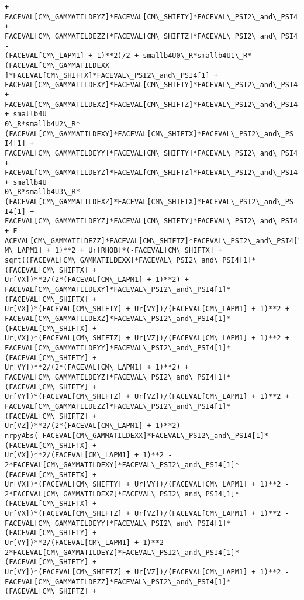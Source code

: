 \documentclass[landscape,letterpaper,10pt,english]{article}
\begin{document}
\begin{Verbatim}[commandchars=\\\{\}]
+ FACEVAL[CM\_GAMMATILDEYZ]*FACEVAL[CM\_SHIFTY]*FACEVAL\_PSI2\_and\_PSI4[1] +
FACEVAL[CM\_GAMMATILDEZZ]*FACEVAL[CM\_SHIFTZ]*FACEVAL\_PSI2\_and\_PSI4[1]) -
(FACEVAL[CM\_LAPM1] + 1)**2)/2 + smallb4U0\_R*smallb4U1\_R*(FACEVAL[CM\_GAMMATILDEXX
]*FACEVAL[CM\_SHIFTX]*FACEVAL\_PSI2\_and\_PSI4[1] +
FACEVAL[CM\_GAMMATILDEXY]*FACEVAL[CM\_SHIFTY]*FACEVAL\_PSI2\_and\_PSI4[1] +
FACEVAL[CM\_GAMMATILDEXZ]*FACEVAL[CM\_SHIFTZ]*FACEVAL\_PSI2\_and\_PSI4[1]) + smallb4U
0\_R*smallb4U2\_R*(FACEVAL[CM\_GAMMATILDEXY]*FACEVAL[CM\_SHIFTX]*FACEVAL\_PSI2\_and\_PS
I4[1] + FACEVAL[CM\_GAMMATILDEYY]*FACEVAL[CM\_SHIFTY]*FACEVAL\_PSI2\_and\_PSI4[1] +
FACEVAL[CM\_GAMMATILDEYZ]*FACEVAL[CM\_SHIFTZ]*FACEVAL\_PSI2\_and\_PSI4[1]) + smallb4U
0\_R*smallb4U3\_R*(FACEVAL[CM\_GAMMATILDEXZ]*FACEVAL[CM\_SHIFTX]*FACEVAL\_PSI2\_and\_PS
I4[1] + FACEVAL[CM\_GAMMATILDEYZ]*FACEVAL[CM\_SHIFTY]*FACEVAL\_PSI2\_and\_PSI4[1] + F
ACEVAL[CM\_GAMMATILDEZZ]*FACEVAL[CM\_SHIFTZ]*FACEVAL\_PSI2\_and\_PSI4[1]))/(FACEVAL[C
M\_LAPM1] + 1)**2 + Ur[RHOB]*(-FACEVAL[CM\_SHIFTX] +
sqrt((FACEVAL[CM\_GAMMATILDEXX]*FACEVAL\_PSI2\_and\_PSI4[1]*(FACEVAL[CM\_SHIFTX] +
Ur[VX])**2/(2*(FACEVAL[CM\_LAPM1] + 1)**2) +
FACEVAL[CM\_GAMMATILDEXY]*FACEVAL\_PSI2\_and\_PSI4[1]*(FACEVAL[CM\_SHIFTX] +
Ur[VX])*(FACEVAL[CM\_SHIFTY] + Ur[VY])/(FACEVAL[CM\_LAPM1] + 1)**2 +
FACEVAL[CM\_GAMMATILDEXZ]*FACEVAL\_PSI2\_and\_PSI4[1]*(FACEVAL[CM\_SHIFTX] +
Ur[VX])*(FACEVAL[CM\_SHIFTZ] + Ur[VZ])/(FACEVAL[CM\_LAPM1] + 1)**2 +
FACEVAL[CM\_GAMMATILDEYY]*FACEVAL\_PSI2\_and\_PSI4[1]*(FACEVAL[CM\_SHIFTY] +
Ur[VY])**2/(2*(FACEVAL[CM\_LAPM1] + 1)**2) +
FACEVAL[CM\_GAMMATILDEYZ]*FACEVAL\_PSI2\_and\_PSI4[1]*(FACEVAL[CM\_SHIFTY] +
Ur[VY])*(FACEVAL[CM\_SHIFTZ] + Ur[VZ])/(FACEVAL[CM\_LAPM1] + 1)**2 +
FACEVAL[CM\_GAMMATILDEZZ]*FACEVAL\_PSI2\_and\_PSI4[1]*(FACEVAL[CM\_SHIFTZ] +
Ur[VZ])**2/(2*(FACEVAL[CM\_LAPM1] + 1)**2) -
nrpyAbs(-FACEVAL[CM\_GAMMATILDEXX]*FACEVAL\_PSI2\_and\_PSI4[1]*(FACEVAL[CM\_SHIFTX] +
Ur[VX])**2/(FACEVAL[CM\_LAPM1] + 1)**2 -
2*FACEVAL[CM\_GAMMATILDEXY]*FACEVAL\_PSI2\_and\_PSI4[1]*(FACEVAL[CM\_SHIFTX] +
Ur[VX])*(FACEVAL[CM\_SHIFTY] + Ur[VY])/(FACEVAL[CM\_LAPM1] + 1)**2 -
2*FACEVAL[CM\_GAMMATILDEXZ]*FACEVAL\_PSI2\_and\_PSI4[1]*(FACEVAL[CM\_SHIFTX] +
Ur[VX])*(FACEVAL[CM\_SHIFTZ] + Ur[VZ])/(FACEVAL[CM\_LAPM1] + 1)**2 -
FACEVAL[CM\_GAMMATILDEYY]*FACEVAL\_PSI2\_and\_PSI4[1]*(FACEVAL[CM\_SHIFTY] +
Ur[VY])**2/(FACEVAL[CM\_LAPM1] + 1)**2 -
2*FACEVAL[CM\_GAMMATILDEYZ]*FACEVAL\_PSI2\_and\_PSI4[1]*(FACEVAL[CM\_SHIFTY] +
Ur[VY])*(FACEVAL[CM\_SHIFTZ] + Ur[VZ])/(FACEVAL[CM\_LAPM1] + 1)**2 -
FACEVAL[CM\_GAMMATILDEZZ]*FACEVAL\_PSI2\_and\_PSI4[1]*(FACEVAL[CM\_SHIFTZ] +

\end{Verbatim}
\end{document}
